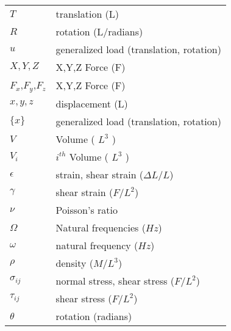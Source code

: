 \begin{tabular}{ll}
    $T$        & translation (L)                      \\
    $R$        & rotation (L/radians)                 \\
    $u$        & generalized load (translation, rotation) \\
    $X,Y,Z$    & X,Y,Z Force (F)                      \\
    $F_x$,$F_y$,$F_z$    & X,Y,Z Force (F)             \\
    $x,y,z$    & displacement (L)                     \\
    $\{x\}$    & generalized load (translation, rotation) \\
    $V$        & Volume  ( $L^3$ )                     \\
    $V_i$      & $i^{th}$ Volume  ( $L^3$ )            \\
    $\epsilon$ & strain, shear strain ($\Delta L/L$)   \\
    $\gamma$   & shear strain ($F/L^2$)                \\
    $\nu$      & Poisson's ratio                       \\
    ${\Omega}$ & Natural frequencies ($Hz$)            \\
    $\omega$   & natural frequency ($Hz$)              \\
    $\rho$     & density ($M/L^3$)                     \\
    $\sigma_{ij}$ & normal stress, shear stress ($F/L^2$) \\
    $\tau_{ij}$   & shear stress ($F/L^2$)                \\
    $\theta$   & rotation (radians)
\end {tabular}
